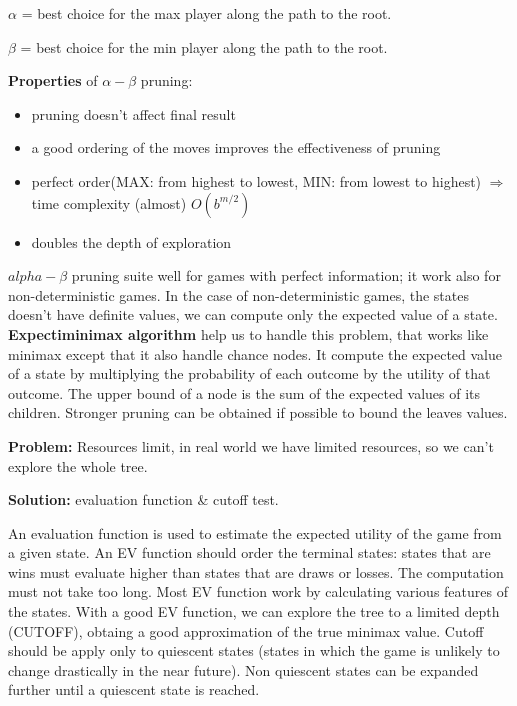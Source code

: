 \documentclass[12pt]{article}
\begin{document}
\begin{enumerate}[label=\textbf{AS.\arabic*}]
    $\alpha$ = best choice for the max player along the path to the root.

    $\beta$ = best choice for the min player along the path to the root.

    \textbf{Properties} of $\alpha - \beta$ pruning:
    \begin{itemize}
        \item pruning doesn't affect final result
        \item a good ordering of the moves improves the effectiveness of pruning
        \item perfect order(MAX: from highest to lowest, MIN: from lowest to highest) $\Rightarrow$ time complexity (almost) $O(b^{m/2})$
        \item doubles the depth of exploration
    \end{itemize}

    $alpha - \beta$ pruning suite well for games with perfect information; it work also for non-deterministic games.
    In the case of non-deterministic games, the states doesn't have definite values, we can compute only the expected value of a state.
    \textbf{Expectiminimax algorithm} help us to handle this problem, that works like minimax 
    except that it also handle chance nodes.
    It compute the expected value of a state by multiplying the probability of each outcome by the utility of that outcome.
    The upper bound of a node is the sum of the expected values of its children.
    Stronger pruning can be obtained if possible to bound the leaves values.

    \textbf{Problem:} Resources limit, in real world we have limited resources, so we can't explore the whole tree.
    
    \textbf{Solution:} evaluation function \& cutoff test.

    An evaluation function is used to estimate the expected utility of the game from a given state.
        An EV function should order the terminal states: 
        states that are wins must evaluate higher than states that are draws or losses.
        The computation must not take too long.
        Most EV function work by calculating various features of the states.
        With a good EV function, we can explore the tree to a limited depth (CUTOFF), obtaing a good approximation of the true minimax value.
        Cutoff should be apply only to quiescent states (states in which the game is unlikely to change drastically in the near future).
        Non quiescent states can be expanded further until a quiescent state is reached.
    

\end{enumerate}
\end{document}
